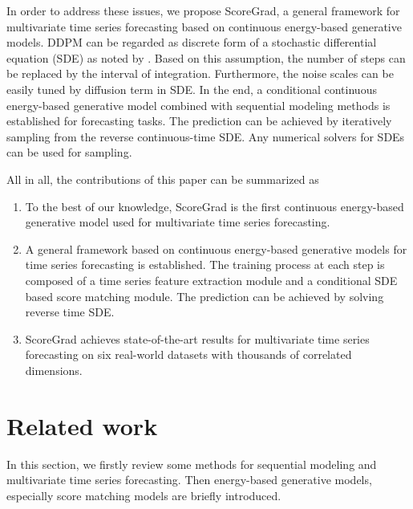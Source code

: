 In order to address these issues,  we propose ScoreGrad, a general framework for multivariate time series forecasting based on continuous energy-based generative models. DDPM can be regarded as discrete form of a stochastic differential equation (SDE) as noted by \cite{song2020score}. Based on this assumption, the number of steps can be replaced by the interval of integration. Furthermore, the noise scales can be easily tuned by diffusion term in SDE. In the end, a conditional continuous energy-based generative model combined with sequential modeling methods is established for forecasting tasks. The prediction can be achieved by iteratively sampling from the reverse continuous-time SDE. Any numerical solvers for SDEs can be used for sampling.

All in all, the contributions of this paper can be summarized as

\begin{enumerate}
\item To the best of our knowledge, ScoreGrad is the first continuous energy-based generative model used for multivariate time series forecasting. %

\item A general framework based on continuous energy-based generative models for time series forecasting is established. The training process at each step is composed of a time series feature extraction module and a conditional SDE based score matching module. The prediction can be achieved by solving reverse time SDE.

\item ScoreGrad achieves state-of-the-art results for multivariate time series forecasting on six real-world datasets with thousands of correlated dimensions.

\end{enumerate}

\section{Related work}
In this section, we firstly review some methods for sequential modeling and multivariate time series forecasting. Then energy-based generative models, especially score matching models are briefly introduced.
